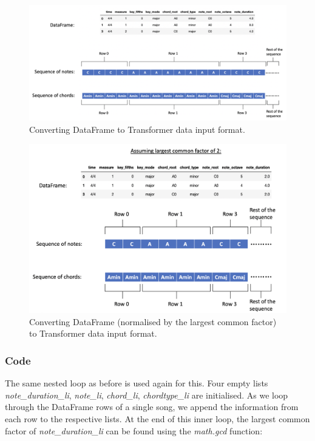\begin{figure}
    \centering
    \includegraphics[scale=0.3]{Figures/TransformerData}
    \decoRule
    \caption{Converting DataFrame to Transformer data input format.}
    \label{fig:Transformer training}
    \end{figure}

\begin{figure}
    \centering
    \includegraphics[scale=0.3]{Figures/Transformer LCF}
    \decoRule
    \caption{Converting DataFrame (normalised by the largest common factor) to Transformer data input format.}
    \label{fig:Transformer LCF}
    \end{figure}

\subsubsection{Code}
The same nested loop as before is used again for this. Four empty lists \emph{note\_duration\_li}, \emph{note\_li}, \emph{chord\_li}, \emph{chordtype\_li} are initialised. As we loop through the DataFrame rows of a single song, we append the information from each row to the respective lists. At the end of this inner loop, the largest common factor of \emph{note\_duration\_li} can be found using the \emph{math.gcd} function:


